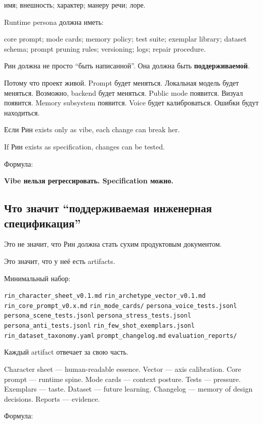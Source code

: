 имя; внешность; характер; манеру речи; лоре.

Runtime persona должна иметь:

core prompt; mode cards; memory policy; test suite; exemplar library;
dataset schema; prompt pruning rules; versioning; logs; repair
procedure.

Рин должна не просто ``быть написанной''. Она должна быть
\textbf{поддерживаемой}.

Потому что проект живой. Prompt будет меняться. Локальная модель будет
меняться. Возможно, backend будет меняться. Public mode появится. Визуал
появится. Memory subsystem появится. Voice будет калиброваться. Ошибки
будут находиться.

Если Рин exists only as vibe, each change can break her.

If Рин exists as specification, changes can be tested.

Формула:

\textbf{Vibe нельзя регрессировать. Specification можно.}

\subsection*{Что значит ``поддерживаемая инженерная спецификация''}

Это не значит, что Рин должна стать сухим продуктовым документом.

Это значит, что у неё есть artifacts.

Минимальный набор:

\texttt{rin\_character\_sheet\_v0.1.md}
\texttt{rin\_archetype\_vector\_v0.1.md}
\texttt{rin\_core\_prompt\_v0.x.md} \texttt{rin\_mode\_cards/\hspace{0pt}}
\texttt{persona\_voice\_tests.jsonl}
\texttt{persona\_scene\_tests.jsonl}
\texttt{persona\_stress\_tests.jsonl}
\texttt{persona\_anti\_tests.jsonl}
\texttt{rin\_few\_shot\_exemplars.jsonl}
\texttt{rin\_dataset\_taxonomy.yaml} \texttt{prompt\_changelog.md}
\texttt{evaluation\_reports/\hspace{0pt}}

Каждый artifact отвечает за свою часть.

Character sheet --- human-readable essence. Vector --- axis calibration.
Core prompt --- runtime spine. Mode cards --- context posture. Tests ---
pressure. Exemplars --- taste. Dataset --- future learning. Changelog
--- memory of design decisions. Reports --- evidence.

Формула:

